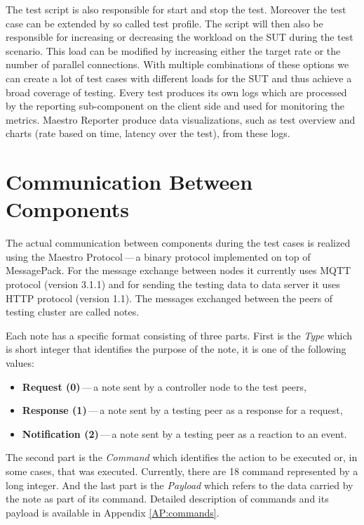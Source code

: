 The test script is also responsible for start and stop the test. Moreover the test case can be extended by so called test profile. The script will then also be responsible for increasing or decreasing the workload on the SUT during the test scenario. This load can be modified by increasing either the target rate or the number of parallel connections. With multiple combinations of these options we can create a lot of test cases with different loads for the SUT and thus achieve a broad coverage of testing. Every test produces its own logs which are processed by the reporting sub-component on the client side and used for monitoring the metrics. Maestro Reporter produce data visualizations, such as test overview and charts (rate based on time, latency over the test), from these logs.

\section{Communication Between Components}
\label{Communication Between Components}
The actual communication between components during the test cases is realized using the Maestro Protocol\,---\,a binary protocol implemented on top of MessagePack\footnotemark{}. For the message exchange between nodes it currently uses MQTT protocol (version 3.1.1) and for sending the testing data to data server it uses HTTP protocol (version 1.1). The messages exchanged between the peers of testing cluster are called notes.


Each note has a specific format consisting of three parts. First is the \emph{Type} which is short integer that identifies the purpose of the note, it is one of the following values:

\begin{itemize}
	\setlength\itemsep{0em}
	\item \textbf{Request (0)}\,---\,a note sent by a controller node to the test peers,
	\item \textbf{Response (1)}\,---\,a note sent by a testing peer as a response for a request,
	\item \textbf{Notification (2)}\,---\,a note sent by a testing peer as a reaction to an event.
\end{itemize}
The second part is the \emph{Command} which identifies the action to be executed or, in some cases, that was executed. Currently, there are 18 command represented by a long integer. And the last part is the \emph{Payload} which refers to the data carried by the note as part of its command. Detailed description of commands and its payload is available in Appendix \ref{AP:commands}.


